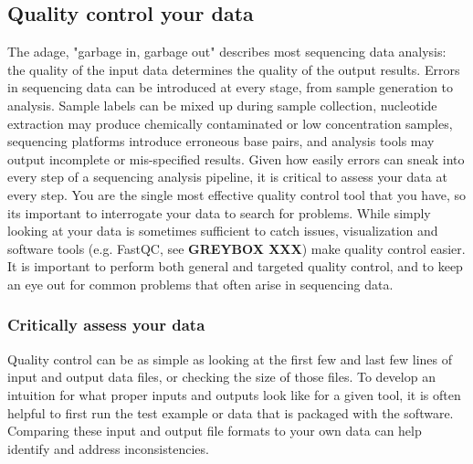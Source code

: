 \documentclass[10pt,letterpaper]{article}
\begin{document}
\subsection*{Quality control your data} %

 
The adage, "garbage in, garbage out" describes most sequencing data analysis: the quality of the input data determines the quality of the output results. Errors in sequencing data can be introduced at every stage, from sample generation to analysis. Sample labels can be mixed up during sample collection, nucleotide extraction may produce chemically contaminated or low concentration samples, sequencing platforms introduce erroneous base pairs, and analysis tools may output incomplete or mis-specified results. Given how easily errors can sneak into every step of a sequencing analysis pipeline, it is critical to assess your data at every step. You are the single most effective quality control tool that you have, so its important to interrogate your data to search for problems. While simply looking at your data is sometimes sufficient to catch issues, visualization and software tools (e.g. FastQC, see \textbf{GREYBOX XXX}) make quality control easier. It is important to perform both general and targeted quality control, and to keep an eye out for common problems that often arise in sequencing data. 

\subsubsection*{Critically assess your data}
Quality control can be as simple as looking at the first few and last few lines of input and output data files, or checking the size of those files. To develop an intuition for what proper inputs and outputs look like for a given tool, it is often helpful to first run the test example or data that is packaged with the software. Comparing these input and output file formats to your own data can help identify and address inconsistencies. 
\end{document}

